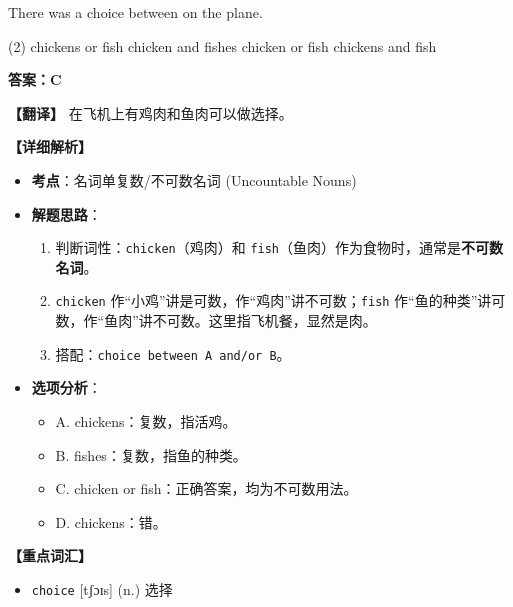 \documentclass[11pt, a4paper]{article}
\newcommand{\analysis}[4]{
    \begin{solutionbox}
        \textbf{答案：#1}
        
        \textbf{【翻译】} #2
        
        \textbf{【详细解析】}
        #3
        
        \textbf{【重点词汇】}
        #4
    \end{solutionbox}
}
\newcommand{\blank}{\underline{\hspace{1.5cm}}}
\begin{document}
\begin{questions}
    \item There was a choice between \blank on the plane.
    \begin{tasks}(2)
        \task chickens or fish \task chicken and fishes
        \task chicken or fish \task chickens and fish
    \end{tasks}
    \analysis{C}{在飞机上有鸡肉和鱼肉可以做选择。}{
        \begin{itemize}
            \item \textbf{考点}：名词单复数/不可数名词 (Uncountable Nouns)
            \item \textbf{解题思路}：
                \begin{enumerate}
                    \item 判断词性：\texttt{chicken}（鸡肉）和 \texttt{fish}（鱼肉）作为食物时，通常是\textbf{不可数名词}。
                    \item \texttt{chicken} 作“小鸡”讲是可数，作“鸡肉”讲不可数；\texttt{fish} 作“鱼的种类”讲可数，作“鱼肉”讲不可数。这里指飞机餐，显然是肉。
                    \item 搭配：\texttt{choice between A and/or B}。
                \end{enumerate}
            \item \textbf{选项分析}：
                \begin{itemize}
                    \item A. chickens：复数，指活鸡。
                    \item B. fishes：复数，指鱼的种类。
                    \item C. chicken or fish：正确答案，均为不可数用法。
                    \item D. chickens：错。
                \end{itemize}
        \end{itemize}
    }{
        \begin{itemize}
            \item \texttt{choice} [tʃɔɪs] (n.) 选择
        \end{itemize}
    }


\end{questions}
\end{document}
